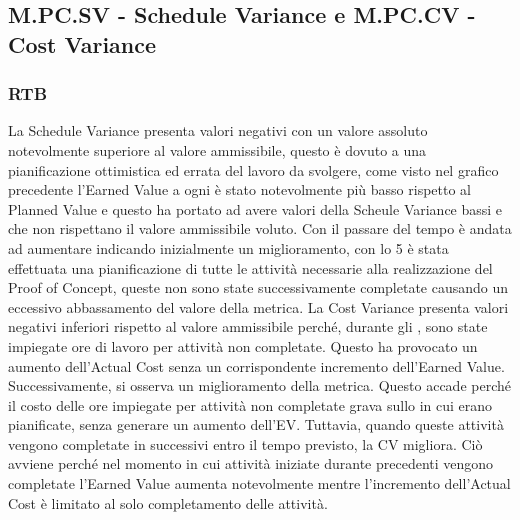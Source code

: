 \subsection{M.PC.SV - Schedule Variance e M.PC.CV - Cost Variance}

\subsubsection{RTB}
La Schedule Variance presenta valori negativi con un valore assoluto notevolmente superiore al valore ammissibile, questo è dovuto a una pianificazione
ottimistica ed errata del lavoro da svolgere, come visto nel grafico precedente l'Earned Value a ogni  è stato notevolmente più basso rispetto al Planned Value
e questo ha portato ad avere valori della Scheule Variance bassi e che non rispettano il valore ammissibile voluto.
Con il passare del tempo è andata ad aumentare indicando inizialmente un miglioramento, con lo  5 è stata effettuata una pianificazione di tutte le attività
necessarie alla realizzazione del Proof of Concept, queste non sono state successivamente completate causando un eccessivo abbassamento del valore della metrica.
La Cost Variance presenta valori negativi inferiori rispetto al valore ammissibile perché, durante gli , sono state impiegate ore di lavoro per attività non completate. 
Questo ha provocato un aumento dell'Actual Cost senza un corrispondente incremento dell'Earned Value.
Successivamente, si osserva un miglioramento della metrica. Questo accade perché il costo delle ore impiegate per attività non completate grava sullo  in cui erano pianificate, 
senza generare un aumento dell'EV. Tuttavia, quando queste attività vengono completate in  successivi entro il tempo previsto, la CV migliora.
Ciò avviene perché nel momento in cui attività iniziate durante  precedenti vengono completate l'Earned Value aumenta notevolmente mentre l'incremento dell'Actual Cost è limitato al solo completamento delle attività.
